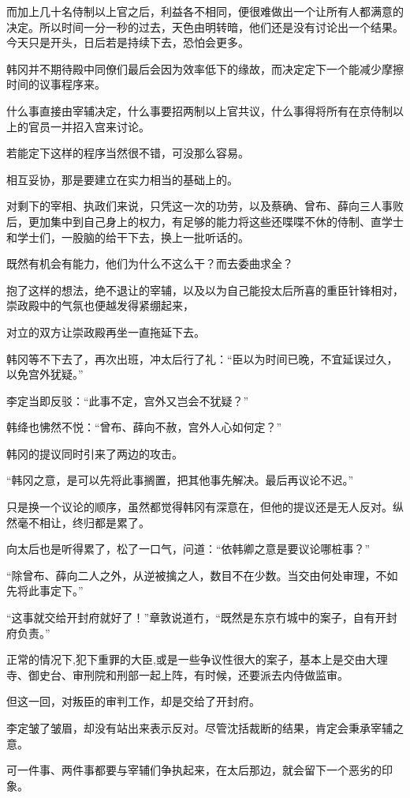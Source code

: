 而加上几十名侍制以上官之后，利益各不相同，便很难做出一个让所有人都满意的决定。所以时间一分一秒的过去，天色由明转暗，他们还是没有讨论出一个结果。今天只是开头，日后若是持续下去，恐怕会更多。

韩冈并不期待殿中同僚们最后会因为效率低下的缘故，而决定定下一个能减少摩擦时间的议事程序来。

什么事直接由宰辅决定，什么事要招两制以上官共议，什么事得将所有在京侍制以上的官员一并招入宫来讨论。

若能定下这样的程序当然很不错，可没那么容易。

相互妥协，那是要建立在实力相当的基础上的。

对剩下的宰相、执政们来说，只凭这一次的功劳，以及蔡确、曾布、薛向三人事败后，更加集中到自己身上的权力，有足够的能力将这些还喋喋不休的侍制、直学士和学士们，一股脑的给干下去，换上一批听话的。

既然有机会有能力，他们为什么不这么干？而去委曲求全？

抱了这样的想法，绝不退让的宰辅，以及以为自己能投太后所喜的重臣针锋相对，崇政殿中的气氛也便越发得紧绷起来，

对立的双方让崇政殿再坐一直拖延下去。

韩冈等不下去了，再次出班，冲太后行了礼：“臣以为时间已晚，不宜延误过久，以免宫外犹疑。”

李定当即反驳：“此事不定，宫外又岂会不犹疑？”

韩绛也怫然不悦：“曾布、薛向不赦，宫外人心如何定？”

韩冈的提议同时引来了两边的攻击。

“韩冈之意，是可以先将此事搁置，把其他事先解决。最后再议论不迟。”

只是换一个议论的顺序，虽然都觉得韩冈有深意在，但他的提议还是无人反对。纵然毫不相让，终归都是累了。

向太后也是听得累了，松了一口气，问道：“依韩卿之意是要议论哪桩事？”

“除曾布、薛向二人之外，从逆被擒之人，数目不在少数。当交由何处审理，不如先将此事定下。”

“这事就交给开封府就好了！”章敦说道冇，“既然是东京冇城中的案子，自有开封府负责。”

正常的情况下,犯下重罪的大臣,或是一些争议性很大的案子，基本上是交由大理寺、御史台、审刑院和刑部一起上阵，有时候，还要派去内侍做监审。

但这一回，对叛臣的审判工作，却是交给了开封府。

李定皱了皱眉，却没有站出来表示反对。尽管沈括裁断的结果，肯定会秉承宰辅之意。

可一件事、两件事都要与宰辅们争执起来，在太后那边，就会留下一个恶劣的印象。

